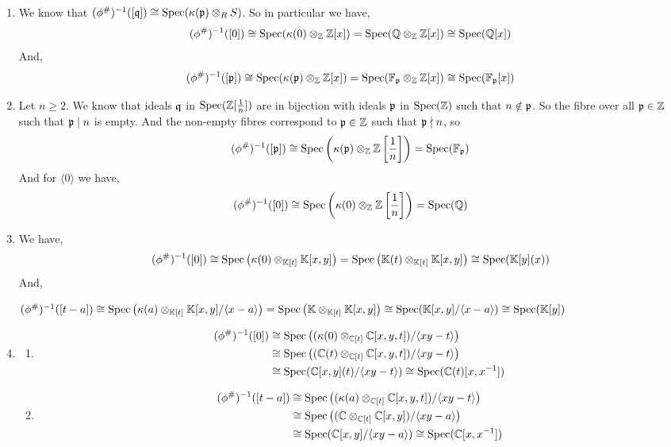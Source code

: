 \documentclass[Notebook.tex]{subfiles}
\begin{document}
\begin{solution}
    \bbni
    \begin{enumerate}
        \item We know that $(\phi^{\#})^{-1}([\operatorname{\mathfrak{q}}]) \cong \operatorname{Spec}(\kappa(\operatorname{\mathfrak{p}}) \otimes_R S)$. So in particular we have, 
        \[(\phi^{\#})^{-1}([0]) \cong \operatorname{Spec}(\kappa(0) \otimes_{\mathbb Z} \mathbb Z[x]) = \operatorname{Spec}(\mathbb Q \otimes_{\mathbb Z} \mathbb Z[x]) \cong \operatorname{Spec}(\mathbb Q[x])\]
        And, 
        \[(\phi^{\#})^{-1}([\operatorname{\mathfrak{p}}]) \cong \operatorname{Spec}(\kappa(\operatorname{\mathfrak{p}}) \otimes_{\mathbb Z} \mathbb Z[x]) = \operatorname{Spec}(\mathbb F_{\operatorname{\mathfrak{p}}} \otimes_{\mathbb Z} \mathbb Z[x]) \cong \operatorname{Spec}(\mathbb F_{\operatorname{\mathfrak{p}}}[x])\]

        \item Let $n \geq 2$. We know that ideals $\operatorname{\mathfrak{q}}$ in $\operatorname{Spec}(\mathbb Z[\frac{1}{n}])$ are in bijection with ideals $\operatorname{\mathfrak{p}}$ in $\operatorname{Spec}(\mathbb Z)$ such that $n \notin \operatorname{\mathfrak{p}}$. So the fibre over all $\operatorname{\mathfrak{p}} \in \mathbb Z$ such that $\operatorname{\mathfrak{p}} \mid n$ is empty. And the non-empty fibres correspond to $\operatorname{\mathfrak{p}} \in \mathbb Z$ such that $\operatorname{\mathfrak{p}} \nmid n$, so
        \[(\phi^{\#})^{-1}([\operatorname{\mathfrak{p}}]) \cong \operatorname{Spec}\left(\kappa(\operatorname{\mathfrak{p}}) \otimes_{\mathbb Z} \mathbb Z\left[\frac{1}{n}\right]\right) = \operatorname{Spec}(\mathbb F_{\operatorname{\mathfrak{p}}})\]
        And for $\langle 0 \rangle$ we have, 
        \[(\phi^{\#})^{-1}([0]) \cong \operatorname{Spec}\left(\kappa(0) \otimes_{\mathbb Z} \mathbb Z\left[\frac{1}{n}\right]\right) = \operatorname{Spec}(\mathbb Q)\]

        
        \item We have, 
        \[(\phi^{\#})^{-1}([0]) \cong \operatorname{Spec}\left(\kappa(0) \otimes_{\mathbb K[t]} \mathbb K[x,y]\right) = \operatorname{Spec}\left(\mathbb K(t) \otimes_{\mathbb K[t]} \mathbb K[x,y]\right)  \cong \operatorname{Spec}( \mathbb K[y] (x))\]
        And, 

        $(\phi^{\#})^{-1}([t-a]) \cong \operatorname{Spec}\left(\kappa(a) \otimes_{\mathbb K[t]} \mathbb K[x,y]/ \langle x-a \rangle\right) = \operatorname{Spec}\left(\mathbb K \otimes_{\mathbb K[t]} \mathbb K[x,y]\right)  \cong \operatorname{Spec}( \mathbb K[x,y]/\langle x - a\rangle) \cong \operatorname{Spec}(\mathbb K[y])$

        
        \item \begin{enumerate} 
            \item \begin{align*}
                (\phi^{\#})^{-1}([0]) &\cong \operatorname{Spec}\left((\kappa(0) \otimes_{\mathbb C[t]} \mathbb C[x,y,t])/\langle xy - t \rangle\right) \\
                &\cong \operatorname{Spec}\left((\mathbb C(t) \otimes_{\mathbb C[t]} \mathbb C[x,y,t])/\langle xy - t \rangle\right) \\
                &\cong \operatorname{Spec}(\mathbb C[x,y](t)/\langle xy - t \rangle) \cong \operatorname{Spec}(\mathbb C(t)[x, x^{-1}])
            \end{align*}
            
            \item \begin{align*}
                (\phi^{\#})^{-1}([t-a]) &\cong \operatorname{Spec}\left((\kappa(a) \otimes_{\mathbb C[t]} \mathbb C[x,y,t])/\langle xy - t \rangle\right) \\
                &\cong \operatorname{Spec}\left((\mathbb C \otimes_{\mathbb C[t]} \mathbb C[x,y])/\langle xy - a \rangle\right) \\
                &\cong \operatorname{Spec}(\mathbb C[x,y]/\langle xy - a \rangle) \cong \operatorname{Spec}(\mathbb C[x, x^{-1}])
            \end{align*}
            


\end{enumerate}
\end{enumerate}
\end{solution}
\end{document}
